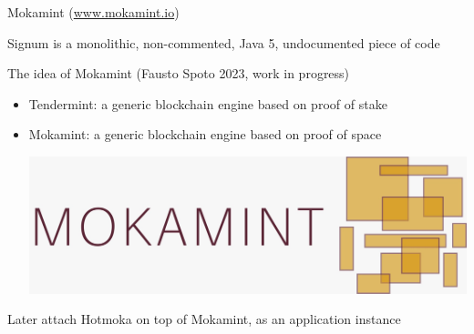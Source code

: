 \documentclass[11pt]{beamer}  %
\begin{document}
\begin{frame}{Mokamint (\url{www.mokamint.io})}

  Signum is a monolithic, non-commented, Java 5, undocumented piece of code

  \bigskip
  \bigskip

  \begin{greenbox}{The idea of Mokamint (Fausto Spoto 2023, work in progress)}
    \begin{itemize}
    \item Tendermint: a generic blockchain engine based on proof of stake
    \item Mokamint: a generic blockchain engine based on proof of space
      \begin{center}
        \includegraphics[scale=0.1,clip=false]{pictures/mokamint_colors.jpg}
      \end{center}
    \end{itemize}
  \end{greenbox}

  \bigskip

  Later attach Hotmoka on top of Mokamint, as an application instance

\end{frame}
\end{document}
